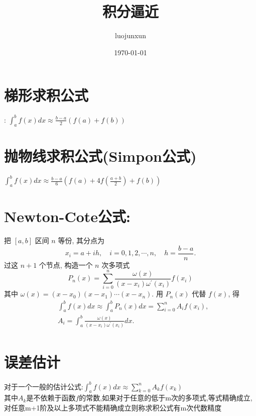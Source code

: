 \documentclass[12pt, a4paper, oneside]{ctexart}
\title{\huge\textbf{积分逼近}}
\author{luojunxun}
\date{\today}
\begin{document}
\maketitle

\section*{梯形求积公式}:
$\int_a^b f(x)dx \approx \frac{b-a}{2}(f(a)+f(b))$

\section*{抛物线求积公式(Simpon公式)}
$\int_a^b f(x)dx \approx \frac{b-a}{6}(f(a)+4f(\frac{a+b}{2})+f(b))$

\section*{Newton-Cote公式:}
把 $[a, b]$ 区间 $n$ 等份, 其分点为
$$
x_i=a+i h, \quad i=0,1,2, \cdots, n, \quad h=\frac{b-a}{n} .
$$
过这 $n+1$ 个节点, 构造一个 $n$ 次多项式
$$
P_n(x)=\sum_{i=0}^n \frac{\omega(x)}{\left(x-x_i\right) \omega^{\prime}\left(x_i\right)} f\left(x_i\right)
$$
其中 $\omega(x)=\left(x-x_0\right)\left(x-x_1\right) \cdots\left(x-x_n\right)$. 用 $P_n(x)$ 代替 $f(x)$, 得
$$
\begin{aligned}
& \int_a^b f(x) d x \approx \int_a^b P_n(x) d x=\sum_{i=0}^n A_i f\left(x_i\right), \\
& A_i=\int_a^b \frac{\omega(x)}{\left(x-x_i\right) \omega^{\prime}\left(x_i\right)} d x . \\
&
\end{aligned}
$$



\section*{误差估计}
对于一个一般的估计公式:$\int_a^b f(x)dx\approx\sum\limits_{k=0}^nA_kf(x_k)$\\
其中$A_k$是不依赖于函数$f$的常数,如果对于任意的低于m次的多项式,等式精确成立,对任意m+1阶及以上多项式不能精确成立则称求积公式有m次代数精度


\end{document}
